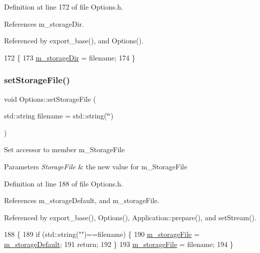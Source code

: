 Definition at line 172 of file Options.\+h.



References m\+\_\+storage\+Dir.



Referenced by export\+\_\+base(), and Options().


\begin{DoxyCode}
172                                                \{
173                 \hyperlink{classOptions_a88d9ed92fceb1c91e4df59bc1f81ab3b}{m\_storageDir} = filename;
174         \}
\end{DoxyCode}
\mbox{\label{classOptions_ac163281337998af5ca3b7a9617337fef}} 
\subsubsection{\texorpdfstring{set\+Storage\+File()}{setStorageFile()}}
{\footnotesize\ttfamily void Options\+::set\+Storage\+File (\begin{DoxyParamCaption}\item[{std\+::string}]{filename = {\ttfamily std\+:\+:string(\char`\"{}\char`\"{})} }\end{DoxyParamCaption})\hspace{0.3cm}{\ttfamily [inline]}}

Set accessor to member m\+\_\+\+Storage\+File 
\begin{DoxyParams}{Parameters}
{\em Storage\+File} & the new value for m\+\_\+\+Storage\+File \\
\hline
\end{DoxyParams}


Definition at line 188 of file Options.\+h.



References m\+\_\+storage\+Default, and m\+\_\+storage\+File.



Referenced by export\+\_\+base(), Options(), Application\+::prepare(), and set\+Stream().


\begin{DoxyCode}
188                                                               \{
189                 \textcolor{keywordflow}{if} (std::string(\textcolor{stringliteral}{""})==filename) \{
190                         \hyperlink{classOptions_a4d952db4e93d3aae6db86d89faa3677a}{m\_storageFile} = \hyperlink{classOptions_ab077e872fd03f7bf64f3a354d0c4a2f5}{m\_storageDefault};
191                         \textcolor{keywordflow}{return};
192                 \}
193                 \hyperlink{classOptions_a4d952db4e93d3aae6db86d89faa3677a}{m\_storageFile} = filename;
194         \}
\end{DoxyCode}
\mbox{\label{classOptions_a8c32e222956c77ed2ec5387318f91394}} 
